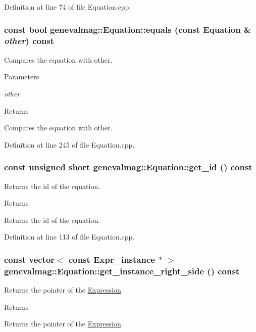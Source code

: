 Definition at line 74 of file Equation.cpp.

\hypertarget{classgenevalmag_1_1Equation_aea30f41bb039e1665cdf1a2075435010}{
\subsubsection[{equals}]{\setlength{\rightskip}{0pt plus 5cm}const bool genevalmag::Equation::equals (const {\bf Equation} \& {\em other}) const}}
\label{classgenevalmag_1_1Equation_aea30f41bb039e1665cdf1a2075435010}
Compares the equation with other. 
\begin{DoxyParams}{Parameters}
\item[{\em other}]\end{DoxyParams}
\begin{DoxyReturn}{Returns}

\end{DoxyReturn}
Compares the equation with other. 

Definition at line 245 of file Equation.cpp.

\hypertarget{classgenevalmag_1_1Equation_a8cd98a3f0a5e2037431b4d31f55b0fbf}{
\subsubsection[{get\_\-id}]{\setlength{\rightskip}{0pt plus 5cm}const unsigned short genevalmag::Equation::get\_\-id () const}}
\label{classgenevalmag_1_1Equation_a8cd98a3f0a5e2037431b4d31f55b0fbf}
Returns the id of the equation. \begin{DoxyReturn}{Returns}

\end{DoxyReturn}
Returns the id of the equation. 

Definition at line 113 of file Equation.cpp.

\hypertarget{classgenevalmag_1_1Equation_a81ce870d6ecab8e37d59ed929562e4c8}{
\subsubsection[{get\_\-instance\_\-right\_\-side}]{\setlength{\rightskip}{0pt plus 5cm}const vector$<$ const {\bf Expr\_\-instance} $\ast$ $>$ genevalmag::Equation::get\_\-instance\_\-right\_\-side () const}}
\label{classgenevalmag_1_1Equation_a81ce870d6ecab8e37d59ed929562e4c8}
Returns the pointer of the \hyperlink{classgenevalmag_1_1Expression}{Expression}. \begin{DoxyReturn}{Returns}

\end{DoxyReturn}
Returns the pointer of the \hyperlink{classgenevalmag_1_1Expression}{Expression}. 

